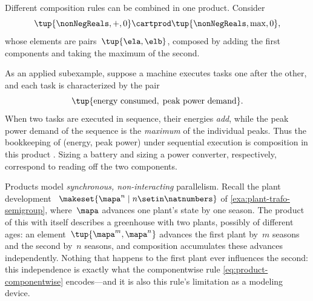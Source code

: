 \begin{example}
    \label{exa:product-energy-peak}
    Different composition rules can be combined in one product.
    Consider
    \begin{equation}
        \tup{\nonNegReals, +, 0} \cartprod \tup{\nonNegReals, \max, 0},
    \end{equation}
    whose elements are pairs~$\tup{\ela, \elb}$, composed by adding the first components and taking the maximum of the second.

    As an applied subexample, suppose a machine executes tasks one after the other, and each task is characterized by the pair
    \begin{equation}
        \tup{\text{energy consumed}, \; \text{peak power demand}}.
    \end{equation}
    When two tasks are executed in sequence, their energies \emph{add}, while the peak power demand of the sequence is the \emph{maximum} of the individual peaks.
    Thus the bookkeeping of (energy, peak power) under sequential execution is composition in this product .
    Sizing a battery and sizing a power converter, respectively, correspond to reading off the two components.
\end{example}

\begin{example}
    \label{exa:product-two-plants}
    Products model \emph{synchronous, non-interacting} parallelism.
    Recall the plant development ~$\makeset{ \mapa^n \mid n \setin \natnumbers }$ of \cref{exa:plant-trafo-semigroup}, where~$\mapa$ advances one plant's state by one season.
    The product of this  with itself describes a greenhouse with two plants, possibly of different ages: an element~$\tup{\mapa^m, \mapa^n}$ advances the first plant by~$m$ seasons and the second by~$n$ seasons, and composition accumulates these advances independently.
    Nothing that happens to the first plant ever influences the second: this independence is exactly what the componentwise rule \cref{eq:product-componentwise} encodes---and it is also this rule's limitation as a modeling device.
\end{example}

